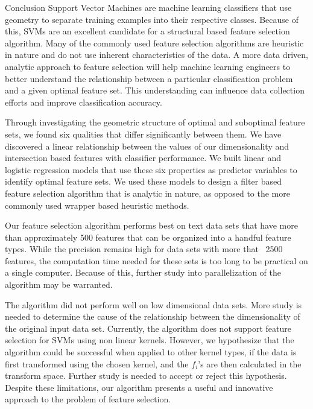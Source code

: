 \documentclass{llncs}
\begin{document}
\begin{section}{Conclusion}
Support Vector Machines are machine learning classifiers that use geometry to separate training examples into their respective classes. Because of this, SVMs are an excellent candidate for a structural based feature selection algorithm. Many of the commonly used feature selection algorithms are heuristic in nature and do not use inherent characteristics of the data. A more data driven, analytic approach to feature selection will help machine learning engineers to better understand the relationship between a particular classification problem and a given optimal feature set. This understanding can influence data collection efforts and improve classification accuracy.

Through investigating the geometric structure of optimal and suboptimal feature sets, we found six qualities that differ significantly between them. We have discovered a linear relationship between the values of our dimensionality and intersection based features with classifier performance. We built linear and logistic regression models that use these six properties as predictor variables to identify optimal feature sets. We used these models to design a filter based feature selection algorithm that is analytic in nature, as opposed to the more commonly used wrapper based heuristic methods. 

Our feature selection algorithm performs best on text data sets that have more than approximately 500 features that can be organized into a handful feature types. While the precision remains high for data sets with more that ~2500 features, the computation time needed for these sets is too long to be practical on a single computer. Because of this, further study into parallelization of the algorithm may be warranted.

The algorithm did not perform well on low dimensional data sets. More study is needed to determine the cause of the relationship between the dimensionality of the original input data set. Currently, the algorithm does not support feature selection for SVMs using non linear kernels. However, we hypothesize that the algorithm could be successful when applied to other kernel types, if the data is first transformed using the chosen kernel, and the $f_i$'s are then calculated in the transform space. Further study is needed to accept or reject this hypothesis. Despite these limitations, our algorithm presents a useful and innovative approach to the problem of feature selection.
\end{section}



\end{document}
